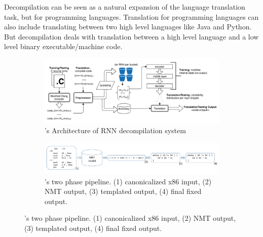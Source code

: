 \documentclass{article}
\begin{document}
Decompilation can be seen as a natural expansion of the language translation task, but for programming languages. Translation for programming languages can also include translating between two high level languages like Java and Python. But decompilation deals with translation between a high level language and a low level binary executable/machine code. 

\begin{figure}[ht]
\centering
\begin{subfigure}{\textwidth}
    \centering
    \includegraphics[width=\textwidth]{Images/decompilation_katz2018.png}
    \caption{\citet{katz2018using}'s Architecture of RNN decompilation system}
    \label{decompilation_katz2018}
\end{subfigure}
\hfill
\begin{subfigure}{\textwidth}
    \centering
    \includegraphics[width=\textwidth]{Images/decompilation_katz2019.png}
    \caption{\citet{katz2019towards}'s two phase pipeline. (1) canonicalized x86 input, (2) NMT output, (3) templated output, (4) final fixed output.}
    \label{decompilation_katz2019}
\end{subfigure}
\end{figure}
\end{document}
